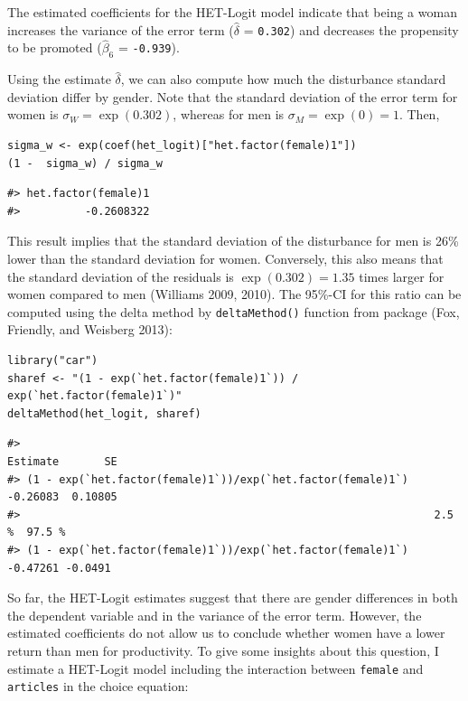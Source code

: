 The estimated coefficients for the HET-Logit model indicate that being a woman increases the variance of the error term (\(\widehat{\delta}\) = \texttt{0.302}) and decreases the propensity to be promoted (\(\widehat{\beta}_6\) = \texttt{-0.939}).

Using the estimate \(\widehat{\delta}\), we can also compute how much the disturbance standard deviation differ by gender. Note that the standard deviation of the error term for women is \(\sigma_W = \exp(0.302)\), whereas for men is \(\sigma_M = \exp(0) = 1\). Then,

\begin{verbatim}
sigma_w <- exp(coef(het_logit)["het.factor(female)1"])
(1 -  sigma_w) / sigma_w
\end{verbatim}

\begin{verbatim}
#> het.factor(female)1 
#>          -0.2608322
\end{verbatim}

This result implies that the standard deviation of the disturbance for men is 26\% lower than the standard deviation for women. Conversely, this also means that the standard deviation of the residuals is \(\exp(0.302) = 1.35\) times larger for women compared to men (Williams 2009, 2010). The 95\%-CI for this ratio can be computed using the delta method by \texttt{deltaMethod()} function from  package (Fox, Friendly, and Weisberg 2013):

\begin{verbatim}
library("car")
sharef <- "(1 - exp(`het.factor(female)1`)) / exp(`het.factor(female)1`)"
deltaMethod(het_logit, sharef)
\end{verbatim}

\begin{verbatim}
#>                                                             Estimate       SE
#> (1 - exp(`het.factor(female)1`))/exp(`het.factor(female)1`) -0.26083  0.10805
#>                                                                2.5 %  97.5 %
#> (1 - exp(`het.factor(female)1`))/exp(`het.factor(female)1`) -0.47261 -0.0491
\end{verbatim}

So far, the HET-Logit estimates suggest that there are gender differences in both the dependent variable and in the variance of the error term. However, the estimated coefficients do not allow us to conclude whether women have a lower return than men for productivity. To give some insights about this question, I estimate a HET-Logit model including the interaction between \texttt{female} and \texttt{articles} in the choice equation:

